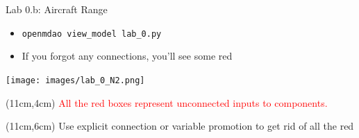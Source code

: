 \documentclass[aspectratio=169, usenames,dvipsnames, 14pt]{beamer}
\begin{document}

\begin{frame}{Lab 0.b: Aircraft Range}
    \begin{itemize}
        \item \texttt{openmdao view\_model lab\_0.py}
        \item If you forgot any connections, you’ll see some red
    \end{itemize}
    
    \texttt{[image: images/lab\_0\_N2.png]}
    
    \begin{textblock*}{4cm}(11cm,4cm)
        \small \textcolor{red}{All the red boxes represent unconnected inputs to components.}
    \end{textblock*}
    
    \begin{textblock*}{4cm}(11cm,6cm)
        \small Use explicit connection or variable promotion to get rid of all the red
    \end{textblock*}
\end{frame}

\end{document}
